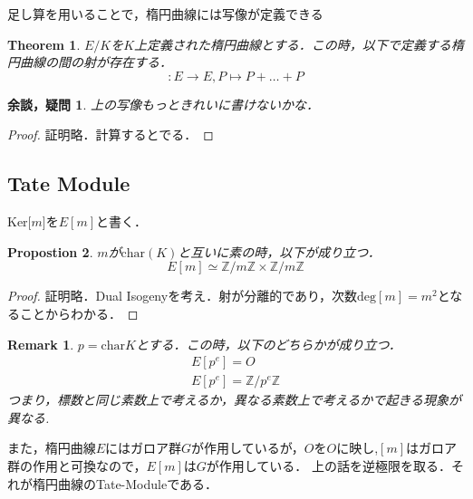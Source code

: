 \documentclass{ujarticle}
\newtheorem{thm}{Theorem}[section]
\newtheorem{prop}[thm]{Propostion}
\newtheorem*{rem}{Remark}
\newtheorem*{yodan}{余談，疑問}
\begin{document}
足し算を用いることで，楕円曲線には写像が定義できる
\begin{thm}
 $E/K$を$K$上定義された楕円曲線とする．この時，以下で定義する楕円曲線の間の射が存在する．
 \begin{equation}
   [m]:E \to E, P \mapsto P + \dots +P
 \end{equation}
\end{thm}
\begin{yodan}
 上の写像もっときれいに書けないかな．
\end{yodan}
\begin{proof}
 証明略．計算するとでる．
\end{proof}

\subsection{Tate Module}
\label{sub:Tate Module}

Ker[$m$]を$E[m]$と書く．
\begin{prop}
  $m$が$\mathrm{char}(K)$と互いに素の時，以下が成り立つ．
  \begin{equation*}
   E[m] \simeq \mathbb{Z}/m \mathbb{Z} \times \mathbb{Z}/m \mathbb{Z}
  \end{equation*}
\end{prop}
\begin{proof}
 証明略．Dual Isogenyを考え．射が分離的であり，次数$\mathrm{deg}[m]=m^2$となることからわかる．
\end{proof}
\begin{rem}
  $p =\mathrm{char}K$とする．この時，以下のどちらかが成り立つ．
  \begin{eqnarray*}
  E[p^e]={O} \\
  E[p^e]=\mathbb{Z}/p^e \mathbb{Z}
  \end{eqnarray*}
つまり，標数と同じ素数上で考えるか，異なる素数上で考えるかで起きる現象が異なる.
\end{rem}
また，楕円曲線$E$にはガロア群$G$が作用しているが，$O$を$O$に映し,$[m]$はガロア群の作用と可換なので，$E[m]$は$G$が作用している．
上の話を逆極限を取る．それが楕円曲線のTate-Moduleである．
\end{document}
